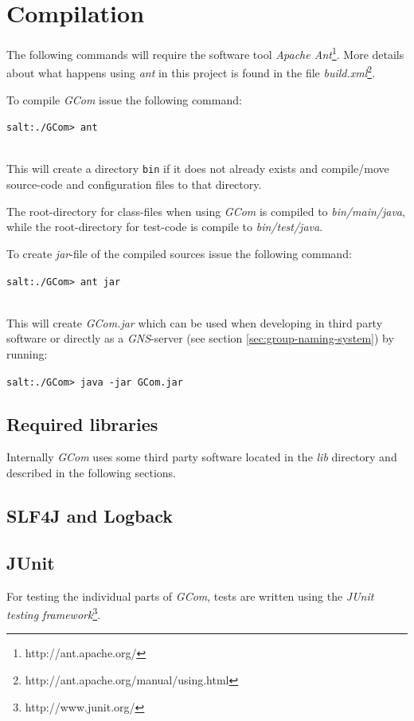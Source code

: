 \documentclass[titlepage, twocolumn, a4paper, 10pt]{article}
\begin{document}
\section{Compilation}\label{sec:compilation}
The following commands will require the software tool \textit{Apache
  Ant}\footnote{http://ant.apache.org/}. More details about what
happens using \textit{ant} in this project is found in the file
\textit{build.xml}\footnote{http://ant.apache.org/manual/using.html}.

To compile \textit{GCom} issue the following command:\\
\begin{footnotesize}
  \verb!salt:./GCom> ant!
\end{footnotesize}\\
This will create a directory \verb!bin! if it does not already exists
and compile/move source-code and configuration files to that
directory.

The root-directory for class-files when using \textit{GCom} is
compiled to \textit{bin/main/java}, while the root-directory for
test-code is compile to \textit{bin/test/java}.

To create \textit{jar}-file of the compiled sources issue the
following command:\\
\begin{footnotesize}
  \verb!salt:./GCom> ant jar!
\end{footnotesize}\\
This will create \textit{GCom.jar} which can be used when developing
in third party software or directly as a \textit{GNS}-server (see
section \ref{sec:group-naming-system}) by
running:\\
\begin{footnotesize}
  \verb!salt:./GCom> java -jar GCom.jar!
\end{footnotesize}

\subsection{Required libraries}\label{sec:required-libraries}
Internally \textit{GCom} uses some third party software located in the
\textit{lib} directory and described in the following sections.

\subsection{SLF4J and Logback}\label{sec:logback}

\subsection{JUnit}\label{sec:junit}
For testing the individual parts of \textit{GCom}, tests are written
using the \textit{JUnit testing
  framework}\footnote{http://www.junit.org/}.
\end{document}
